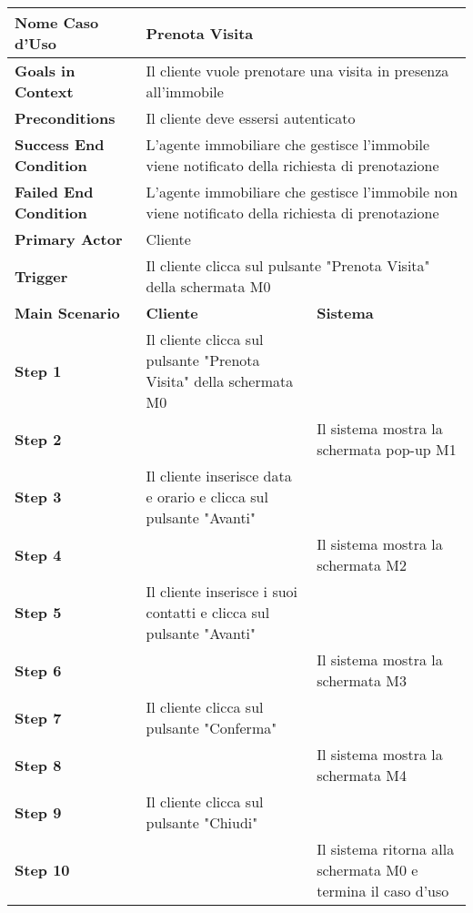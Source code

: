 \begin{longtable}{|m{5cm}|m{5cm}|m{5cm}|}
        \hline
        \textbf{Nome Caso d'Uso} & \multicolumn{2}{p{10cm}|}{Prenota Visita} \\
        \hline
        \textbf{Goals in Context} & \multicolumn{2}{p{10cm}|}{Il cliente vuole prenotare una visita in presenza all'immobile} \\
        \hline
        \textbf{Preconditions}
        & \multicolumn{2}{p{10cm}|}{Il cliente deve essersi autenticato} \\
        \hline
        \textbf{Success End Condition}
        & \multicolumn{2}{p{10cm}|}{L'agente immobiliare che gestisce l'immobile viene notificato della richiesta di prenotazione} \\
        \hline
        \textbf{Failed End Condition}
        & \multicolumn{2}{p{10cm}|}{L'agente immobiliare che gestisce l'immobile non viene notificato della richiesta di prenotazione} \\
        \hline
        \textbf{Primary Actor}
        & \multicolumn{2}{p{10cm}|}{Cliente} \\
        \hline
        \textbf{Trigger}
        & \multicolumn{2}{p{10cm}|}{Il cliente clicca sul pulsante "Prenota Visita" della schermata M0} \\
        \hline

        \textbf{Main Scenario} & \textbf{Cliente} & \textbf{Sistema} \\

        \hline
        \textbf{Step 1}& Il cliente clicca sul pulsante "Prenota Visita" della schermata M0 & \\
        \hline
        \textbf{Step 2}&  & Il sistema mostra la schermata pop-up M1 \\
        \hline
        \textbf{Step 3}& Il cliente inserisce data e orario e clicca sul pulsante "Avanti" & \\
        \hline
        \textbf{Step 4} & & Il sistema mostra la schermata M2 \\
        \hline
        \textbf{Step 5} & Il cliente inserisce i suoi contatti e clicca sul pulsante "Avanti" & \\
        \hline
        \textbf{Step 6} & &Il sistema mostra la schermata M3\\ 
        \hline
        \textbf{Step 7} & Il cliente clicca sul pulsante "Conferma" & \\
        \hline
        \textbf{Step 8} & & Il sistema mostra la schermata M4 \\
        \hline
        \textbf{Step 9} & Il cliente clicca sul pulsante "Chiudi" & \\
        \hline
        \textbf{Step 10} & & Il sistema ritorna alla schermata M0 e termina il caso d'uso \\
        \hline
    \end{longtable}
    
